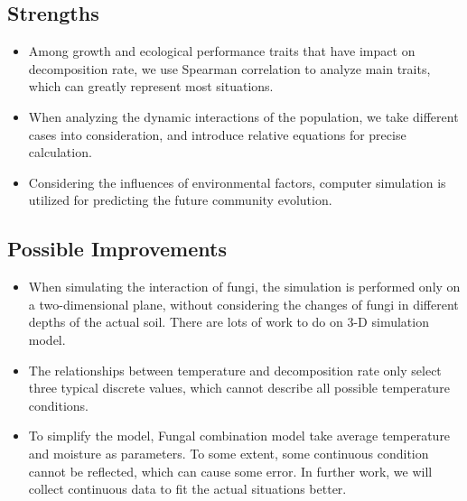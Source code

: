\documentclass{mcmthesis}
\begin{document}
\subsection{Strengths}

\begin{itemize}
  \item Among growth and ecological performance traits that have impact on decomposition rate, we use Spearman correlation to analyze main traits, which can greatly represent most situations.
  \item When analyzing the dynamic interactions of the population, we take different cases into consideration, and introduce relative equations for precise calculation.
  \item Considering the influences of environmental factors, computer simulation is utilized for predicting the future community evolution.
\end{itemize}

\subsection{Possible Improvements}

\begin{itemize}
  \item When simulating the interaction of fungi, the simulation is performed only on a two-dimensional plane, without considering the changes of fungi in different depths of the actual soil. There are lots of work to do on 3-D simulation model.
  \item The relationships between temperature and decomposition rate only select three typical discrete values, which cannot describe all possible temperature conditions.
  \item To simplify the model, Fungal combination model take average temperature and moisture as parameters. To some extent, some continuous condition cannot be reflected, which can cause some error. In further work, we will collect continuous data to fit the actual situations better.
\end{itemize}

{}


\newpage
\end{document}
